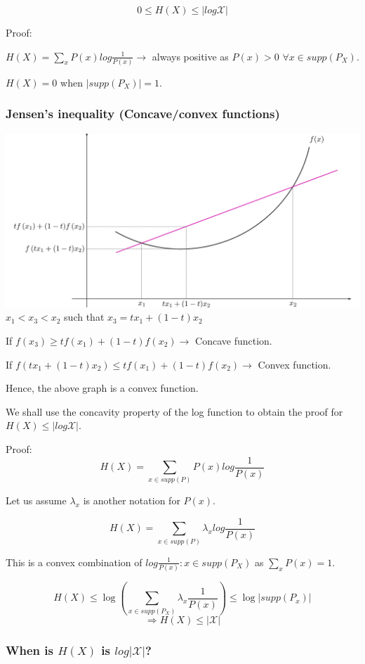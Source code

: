 \documentclass{article}
\begin{document}
$$ 0 \leq H(X) \leq |log \mathcal X|$$

Proof:

$ H(X)= \sum_x P(x)log \frac{1}{P(x)} \rightarrow $ always positive as $P(x)>0$ $\forall x \in supp(P_X)$.

$H(X)= 0$ when $|supp(P_X)|=1$.

\subsubsection{Jensen's inequality (Concave/convex functions)}

\includegraphics[width=\textwidth]{graph.png}
$x_1 < x_3 <x_2 $ such that $x_3= tx_1+(1-t)x_2$

If $f(x_3) \geq tf(x_1)+(1-t)f(x_2) \rightarrow $ Concave function.

If $f(tx_1+(1-t)x_2) \leq tf(x_1)+(1-t)f(x_2) \rightarrow $ Convex function.

Hence, the above graph is a convex function.

We shall use the concavity property of the log function to obtain the proof for $ H(X) \leq |log \mathcal X| $.

Proof:
$$ H(X)= \sum_{x \in supp(P)} P(x)log\frac{1}{P(x)}$$

Let us assume $\lambda_x$ is another notation for $P(x)$.

$$H(X)= \sum_{x \in supp(P)} \lambda_x log\frac{1}{P(x)}$$

This is a convex combination of $log\frac{1}{P(x)}:x \in supp(P_X)$ as $\sum_{x}P(x)=1$.

$$ H(X) \leq \log \left(\sum_{x \in supp(P_X)}\lambda_x \frac{1}{P(x)} \right) \leq \log |supp(P_x)|$$
$$ \Rightarrow H(X) \leq |\mathcal X |$$

\subsubsection{When is $H(X)$ is $ log|\mathcal X|$?}
\end{document}
